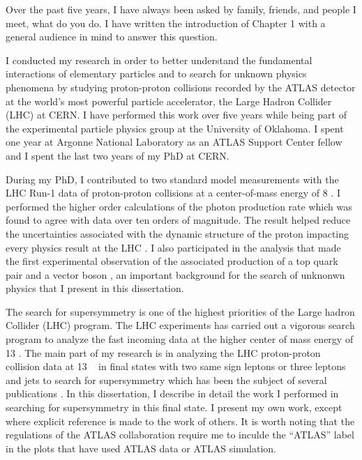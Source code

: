 Over the past five years, 
I have always been asked by family, friends, 
and people I meet, what do you do.
I have written the introduction of Chapter 1 with a general audience in mind to answer this
question.

I conducted  my research in order to  better understand the fundamental interactions of elementary particles 
and to search for unknown physics phenomena by studying proton-proton collisions recorded by the ATLAS detector at the world's
most powerful particle accelerator, the Large Hadron Collider (LHC) at CERN.
I have performed this work over five years while being part of the  experimental particle physics group at the University of Oklahoma.
I spent one year at Argonne National Laboratory as an ATLAS Support Center fellow and I spent the last two years of my PhD at CERN. 

During my PhD, I contributed to two standard model measurements with the LHC Run-1 data of proton-proton collisions at 
a center-of-mass energy of 8 \TeV.
I performed the higher order calculations of the photon production rate which was found to agree with data over ten orders of 
magnitude. The result helped reduce the uncertainties associated with the dynamic structure of the proton impacting
every physics result at the LHC \cite{paper-2015-Photon}.
I also participated in the analysis that made the first experimental observation of the  associated production of a top quark pair
and a vector boson \cite{paper-2015-ttV}, an important background for the search of unknonwn physics that I present in this dissertation.

The search for supersymmetry is one of the highest priorities of the 
Large hadron Collider (LHC) program. The LHC experiments has carried out a 
vigorous search program to analyze the fast incoming data at the higher 
center of mass energy of 13 \TeV. 
The main part of my research is in analyzing the LHC proton-proton collision data at 13 \TeV~
in final states with two same sign leptons or three leptons and jets to search for supersymmetry
which has been the subject of several publications \cite{Aaboud:2017dmy,conf-2016-SS3L,paper-2015-SS3L,conf-2015-SS3L}. 
In this dissertation, I describe in detail the work I performed in searching for supersymmetry in this final state.
I present my own work, except where explicit reference is made to the work of others.
It is worth noting that the regulations of the ATLAS collaboration require me to inculde 
the ``ATLAS'' label in the plots that have used ATLAS data or ATLAS simulation. 


